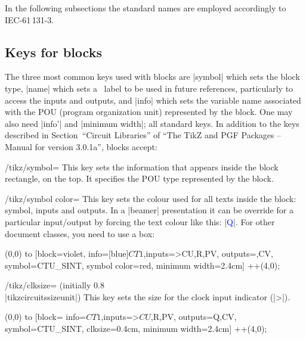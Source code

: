 \documentclass[a4paper]{ltxdoc}
\begin{document}
In the following subsections the standard names are employed accordingly to IEC-61\,131-3.

\subsection{Keys for blocks}

The three most common keys used with blocks are |symbol| which sets the block type, |name| which sets a \tikzname\ label to be used in future references, particularly to access the inputs and outputs, and |info| which sets the variable name associated with the POU (program organization unit) represented by the block. One may also need |info'| and |minimum width|; all standard keys. In addition to the keys described in Section~``Circuit Libraries'' of ``The TikZ and PGF Packages -- Manual for version 3.0.1a'', blocks accept: 
\begin{key}{/tikz/symbol=}
This key sets the information that appears inside the block rectangle, on the top. It specifies the POU type represented by the block.
\end{key}

\begin{key}{/tikz/symbol color=}
This key sets the colour used for all texts inside the block: symbol, inputs and outputs. In a |beamer| presentation it can be override for a particular input/output by forcing the text colour like this: |{\textcolor{blue}{Q}}|. For other document classes, you need to use a box:
\begin{codeexample}[width=4.4cm]
\newsavebox{\myeqbox} %
\savebox{\myeqbox}{\textcolor{blue}{Q}}
 \draw[orange](0,0) to [block={violet,
   info={[blue]$CT1$},inputs={>CU,R,PV}, outputs={\usebox{\myeqbox},CV},
   symbol=CTU\_SINT, symbol color=red, minimum width=2.4cm}] ++(4,0);
\end{codeexample}
\end{key}


\begin{key}{/tikz/clksize= (initially 0.8\\|tikzcircuitssizeunit|)}
This key sets the size for the clock input indicator (|>|).
\begin{codeexample}[]
 \draw(0,0) to [block={
   info=$CT1$,inputs={>$CU$,R,PV}, outputs={Q,CV},
   symbol=CTU\_SINT, clksize=0.4cm,
   minimum width=2.4cm}]  ++(4,0);
\end{codeexample}
\end{key}
\end{document}
